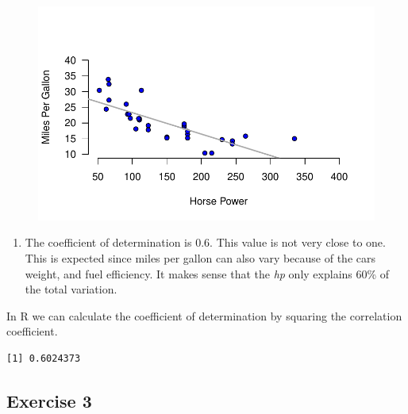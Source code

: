 \documentclass[
  letterpaper,
  DIV=11,
  numbers=noendperiod]{scrreprt}
\newenvironment{Shaded}{\begin{snugshade}}{\end{snugshade}}
\newcommand{\DecValTok}[1]{\textcolor[rgb]{0.68,0.00,0.00}{#1}}
\newcommand{\FunctionTok}[1]{\textcolor[rgb]{0.28,0.35,0.67}{#1}}
\newcommand{\NormalTok}[1]{\textcolor[rgb]{0.00,0.23,0.31}{#1}}
\newcommand{\SpecialCharTok}[1]{\textcolor[rgb]{0.37,0.37,0.37}{#1}}
\providecommand{\tightlist}{%
  \setlength{\itemsep}{0pt}\setlength{\parskip}{0pt}}\usepackage{longtable,booktabs,array}
\begin{document}
\begin{figure}[H]

{\centering \includegraphics{./07-RegressionI_files/figure-pdf/unnamed-chunk-14-1.pdf}

}

\end{figure}

\begin{enumerate}
\def\labelenumi{\arabic{enumi}.}
\setcounter{enumi}{2}
\tightlist
\item
  The coefficient of determination is \(0.6\). This value is not very
  close to one. This is expected since miles per gallon can also vary
  because of the cars weight, and fuel efficiency. It makes sense that
  the \emph{hp} only explains \(60\)\% of the total variation.
\end{enumerate}

In R we can calculate the coefficient of determination by squaring the
correlation coefficient.

\begin{Shaded}
\end{Shaded}

\begin{verbatim}
[1] 0.6024373
\end{verbatim}

\hypertarget{exercise-3-11}{%
\subsection*{Exercise 3}\label{exercise-3-11}}
\end{document}
